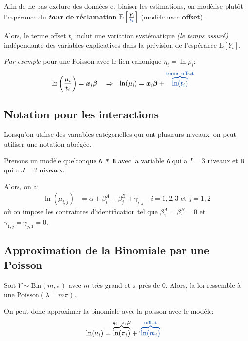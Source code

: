 \documentclass[10pt, french]{article}
\begin{document}
\begin{multicols*}{3}
Afin de ne pas exclure des données et biaiser les estimations, on modélise plutôt l'espérance du \textbf{\textit{taux} de réclamation} $\text{E}\left[\frac{Y_{i}}{\textcolor{cobalt}{t_{i}}}\right]$ (modèle avec \textcolor{cobalt}{\textbf{offset}}).

Alors, \textcolor{cobalt}{le terme offset $t_{i}$} inclut une variation systématique \textit{(le temps assuré)} indépendante des variables explicatives dans la prévision de l'espérance $\text{E}\left[Y_{i}\right]$.

\textit{Par exemple} pour une Poisson avec le lien canonique $\eta_{i} = \ln \mu_{i}$:
\begin{align*}
	\ln \left( \frac{\mu_i}{t_i} \right) 
	&= 	\bm{x}_i \bm{\beta} 	&
&\Rightarrow	&
	\ln (\mu_i) 
	&= 	\bm{x}_i \bm{\beta} + 
		\textcolor{cobalt}{\overset{\text{terme offset}}{\overbrace{\ln (t_i) }}}
\end{align*}

\subsection*{Notation pour les interactions}
Lorsqu'on utilise des variables catégorielles qui ont plusieurs niveaux, on peut utiliser une notation abrégée. 

Prenons un modèle quelconque \verb=A * B= avec la variable \verb=A= qui a $I = 3$ niveaux et \verb=B= qui a $J = 2$ niveaux.

Alors, on a:
\begin{align*}
	\ln (\mu_{i,j}) 
	&= 	\alpha 	+ \beta_i^{A} 	+	\beta_j^B 	+	\gamma_{i,j} 
			\quad i = 1, 2, 3 \text{ et } j = 1, 2
\end{align*}
où on impose les contraintes d'identification tel que $\beta_1^A = \beta_1^B = 0$ et $\gamma_{1,j} = \gamma_{j,1} = 0$. 

\subsection*{Approximation de la Binomiale par une Poisson}
Soit $Y \sim \text{Bin}(m, \pi)$ avec $m$ très grand et $\pi$ près de 0.
Alors, la loi ressemble à une $\text{Poisson}(\lambda = m \pi)$.

On peut donc approximer la binomiale avec la poisson avec le modèle:
\begin{align*}
	\ln(\mu_i) 
	&= 	\overset{\eta_{i} = x_{i}\bm{\beta}}{\overbrace{\ln(\pi_i)}} + 
				`\textcolor{cobalt}{\overset{\text{offset}}{\overbrace{\ln(m_i)}}}
\end{align*}


\end{multicols*}
\end{document}
